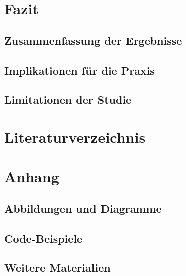 \documentclass[12pt,a4paper,bibliography=totocnumbered,listof=totocnumbered]{scrartcl}
\begin{document}
\section{Fazit}
\subsection{Zusammenfassung der Ergebnisse}
\subsection{Implikationen für die Praxis}
\subsection{Limitationen der Studie}

\section{Literaturverzeichnis}

\section{Anhang}
\subsection{Abbildungen und Diagramme}
\subsection{Code-Beispiele}
\subsection{Weitere Materialien}
\end{document}
